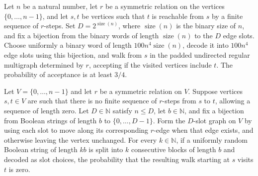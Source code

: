 \begin{theorem}
\label{Randomized.three_quarters_le_randProb_padWalk}
\leanok
{}
Let $n$ be a natural number, let $r$ be a symmetric relation on the vertices
$\{0,\ldots,n-1\}$, and let $s,t$ be vertices such that $t$ is reachable from $s$ by a
finite sequence of $r$-steps. Set $D=2^{\operatorname{size}(n)}$, where
$\operatorname{size}(n)$ is the binary size of $n$, and fix a bijection from the binary
words of length $\operatorname{size}(n)$ to the $D$ edge slots. Choose uniformly a
binary word of length $100n^4\operatorname{size}(n)$, decode it into $100n^4$ edge slots
using this bijection, and walk from $s$ in the padded undirected regular multigraph
determined by $r$, accepting if the visited vertices include $t$. The probability of
acceptance is at least $3/4$.
\end{theorem}

\begin{theorem}
\label{Randomized.randProb_padWalk_eq_zero}
\leanok
{}
Let $V=\{0,\ldots,n-1\}$ and let $r$ be a symmetric relation on $V$. Suppose vertices
$s,t\in V$ are such that there is no finite sequence of $r$-steps from $s$ to $t$,
allowing a sequence of length zero. Let $D\in\mathbb{N}$ satisfy $n\le D$, let
$b\in\mathbb{N}$, and fix a bijection from Boolean strings of length $b$ to
$\{0,\ldots,D-1\}$. Form the $D$-slot graph on $V$ by using each slot to move along its
corresponding $r$-edge when that edge exists, and otherwise leaving the vertex
unchanged. For every $k\in\mathbb{N}$, if a uniformly random Boolean string of length
$kb$ is split into $k$ consecutive blocks of length $b$ and decoded as slot choices, the
probability that the resulting walk starting at $s$ visits $t$ is zero.
\end{theorem}
